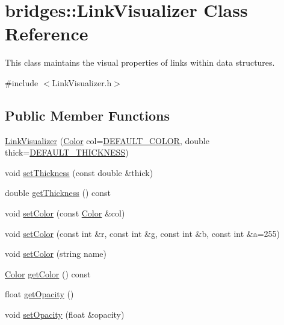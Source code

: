 \hypertarget{classbridges_1_1_link_visualizer}{}\section{bridges\+:\+:Link\+Visualizer Class Reference}
\label{classbridges_1_1_link_visualizer}


This class maintains the visual properties of links within data structures.  




{\ttfamily \#include $<$Link\+Visualizer.\+h$>$}

\subsection*{Public Member Functions}
\begin{DoxyCompactItemize}
\item 
\hyperlink{classbridges_1_1_link_visualizer_aeb26445f5823fe1ccee1c2dd9c27fb90}{Link\+Visualizer} (\hyperlink{classbridges_1_1_color}{Color} col=\hyperlink{classbridges_1_1_link_visualizer_a7698ad5b243041377d81152a339d1282}{D\+E\+F\+A\+U\+L\+T\+\_\+\+C\+O\+L\+O\+R}, double thick=\hyperlink{classbridges_1_1_link_visualizer_ab790c33080c769008114db34d5ec8950}{D\+E\+F\+A\+U\+L\+T\+\_\+\+T\+H\+I\+C\+K\+N\+E\+S\+S})
\item 
void \hyperlink{classbridges_1_1_link_visualizer_a932d7408b8010c782a42aa02903b8ec6}{set\+Thickness} (const double \&thick)
\item 
double \hyperlink{classbridges_1_1_link_visualizer_a22513552576c20a13d6fd81348abb815}{get\+Thickness} () const 
\item 
void \hyperlink{classbridges_1_1_link_visualizer_adedc1f2b7d5d562b115ef9d8ae19fa73}{set\+Color} (const \hyperlink{classbridges_1_1_color}{Color} \&col)
\item 
void \hyperlink{classbridges_1_1_link_visualizer_a138cb68eb0e2d089bf70e0ca187246c3}{set\+Color} (const int \&r, const int \&g, const int \&b, const int \&a=255)
\item 
void \hyperlink{classbridges_1_1_link_visualizer_a9fc861a28c81944b224af019523416fc}{set\+Color} (string name)
\item 
\hyperlink{classbridges_1_1_color}{Color} \hyperlink{classbridges_1_1_link_visualizer_a4b244bde324fc61c262954e590db20a6}{get\+Color} () const 
\item 
float \hyperlink{classbridges_1_1_link_visualizer_a920f44fbef02adf01906323bb4fb2994}{get\+Opacity} ()
\item 
void \hyperlink{classbridges_1_1_link_visualizer_a0d27aa1204086122e262a125fe3648b1}{set\+Opacity} (float \&opacity)
\end{DoxyCompactItemize}
